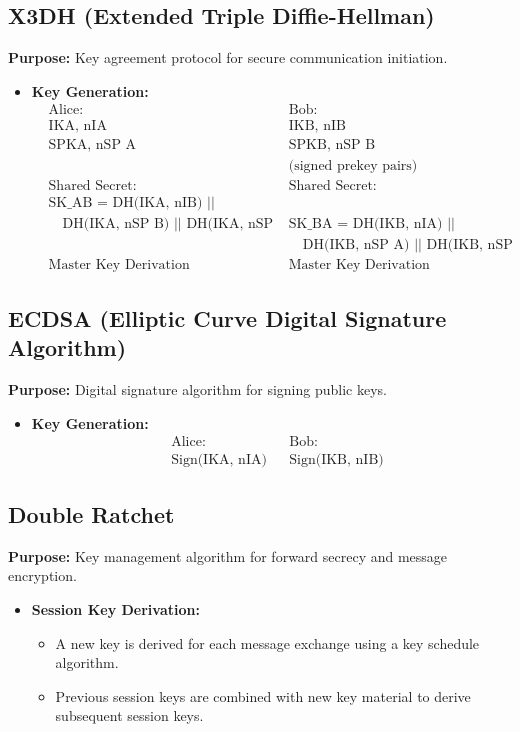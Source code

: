 \documentclass[11pt]{article}
\begin{document}
\subsection{X3DH (Extended Triple Diffie-Hellman)}
\textbf{Purpose:} Key agreement protocol for secure communication initiation.
\begin{itemize}
    \item \textbf{Key Generation:} 
    \begin{align*}
        & \text{Alice:} & & \text{Bob:} \\
        & \text{IKA, nIA} & & \text{IKB, nIB} \\
        & \text{SPKA, nSP A} & & \text{SPKB, nSP B} \\
        & & & \text{(signed prekey pairs)} \\
        & \text{Shared Secret:} & & \text{Shared Secret:} \\
        & \text{SK\_AB = DH(IKA, nIB) || DH(IKA, nIBP) ||} \\
        & \quad \text{DH(IKA, nSP B) || DH(IKA, nSP BP)} & & \text{SK\_BA = DH(IKB, nIA) || DH(IKB, nIAP) ||} \\
        & & & \quad \text{DH(IKB, nSP A) || DH(IKB, nSP AP)} \\
        & \text{Master Key Derivation} & & \text{Master Key Derivation}
    \end{align*}
\end{itemize}

\subsection{ECDSA (Elliptic Curve Digital Signature Algorithm)}
\textbf{Purpose:} Digital signature algorithm for signing public keys.
\begin{itemize}
    \item \textbf{Key Generation:} 
    \begin{align*}
        & \text{Alice:} & & \text{Bob:} \\
        & \text{Sign(IKA, nIA)} & & \text{Sign(IKB, nIB)}
    \end{align*}
\end{itemize}

\subsection{Double Ratchet}
\textbf{Purpose:} Key management algorithm for forward secrecy and message encryption.
\begin{itemize}
    \item \textbf{Session Key Derivation:} 
    \begin{itemize}
        \item A new key is derived for each message exchange using a key schedule algorithm.
        \item Previous session keys are combined with new key material to derive subsequent session keys.
    \end{itemize}
\end{itemize}
\end{document}
